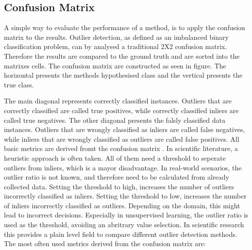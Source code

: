 

\subsection{Confusion Matrix}
A simple way to evaluate the performance of a method, is to apply the confusion matrix to the results. 
Outlier detection, as defined as an imbalanced binary classification problem, can by analysed a traditional 2X2 confusion matrix.
Therefore the results are compared to the ground truth and are sorted into the matrixes cells.
The confusion matrix are constructed as seen in figure.
The horizontal presents the methods hypothesised class and the vertical presents the true class.




The main diagonal represents correctly classified instances.
Outliers that are correctly classified are called true positives, while correctly classified inliers are called true negatives.
The other diagonal presents the falsly classified data instances.
Outliers that are wrongly classified as inliers are called false negatives, while inliers that are wrongly classified as outliers are called false positives.
All basic metrics are derived fromt the confusion matrix \citep[p.4]{saito2015precision}. 
In scientific literature, a heuristic approach is often taken.
All of them need a threshold to seperate outliers from inliers, which is a mayor disadvantage.
In real-world scenarios, the outlier ratio is not known, and therefore need to be calculated from already collected data.
Setting the threshold to high, increases the number of outliers incorrectly classified as inliers.
Setting the threshold to low, increases the number of inliers incorrectly classified as outliers.
Depending on the domain, this might lead to incorrect decisions.  
Especially in unsupervised learning, the outlier ratio is used as the threshold, avoiding an abritrary value selection.
In scientific research this provides a plain level field to compare different outlier detection methods.
The most often used metrics derived from the confusion matrix are:


